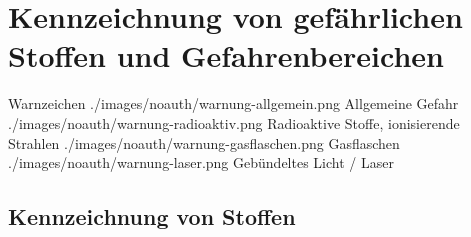\section{Kennzeichnung von gefährlichen Stoffen und
Gefahrenbereichen}
\label{topic:gefahrsymbole}

\begin{PictureSeries}{}{Warnzeichen}
{./images/noauth/warnung-allgemein.png}
{Allgemeine Gefahr}
{./images/noauth/warnung-radioaktiv.png}
{Radioaktive Stoffe, ionisierende
Strahlen}
{./images/noauth/warnung-gasflaschen.png}
{Gasflaschen}
{./images/noauth/warnung-laser.png}
{Gebündeltes Licht / Laser}
\end{PictureSeries}


\subsection{Kennzeichnung von Stoffen}

